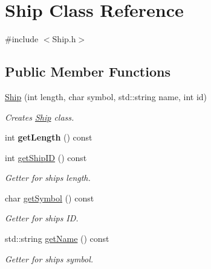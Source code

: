 \hypertarget{class_ship}{}\section{Ship Class Reference}
\label{class_ship}


{\ttfamily \#include $<$Ship.\+h$>$}

\subsection*{Public Member Functions}
\begin{DoxyCompactItemize}
\item 
\mbox{\hyperlink{class_ship_a1836f4ce3f031b8490a37ac02c5ad65b}{Ship}} (int length, char symbol, std\+::string name, int id)
\begin{DoxyCompactList}\small\item\em Creates \mbox{\hyperlink{class_ship}{Ship}} class. \end{DoxyCompactList}\item 
\mbox{\label{class_ship_a5c36a859d4600ba27c091fa9254faadd}} 
int {\bfseries get\+Length} () const
\item 
\mbox{\label{class_ship_add61243cfbd60ea5fc3ab79d4ae0c99d}} 
int \mbox{\hyperlink{class_ship_add61243cfbd60ea5fc3ab79d4ae0c99d}{get\+Ship\+ID}} () const
\begin{DoxyCompactList}\small\item\em Getter for ship\textquotesingle{}s length. \end{DoxyCompactList}\item 
\mbox{\label{class_ship_a86ea5893e49e12ceeb6ff43a6f78d86d}} 
char \mbox{\hyperlink{class_ship_a86ea5893e49e12ceeb6ff43a6f78d86d}{get\+Symbol}} () const
\begin{DoxyCompactList}\small\item\em Getter for ship\textquotesingle{}s ID. \end{DoxyCompactList}\item 
\mbox{\label{class_ship_a2ae29387f5c93aa238c3d90526118a20}} 
std\+::string \mbox{\hyperlink{class_ship_a2ae29387f5c93aa238c3d90526118a20}{get\+Name}} () const
\begin{DoxyCompactList}\small\item\em Getter for ship\textquotesingle{}s symbol. \end{DoxyCompactList}\end{DoxyCompactItemize}


